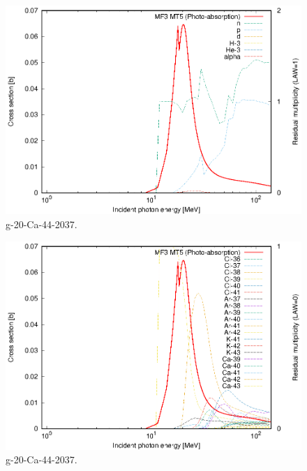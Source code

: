 \begin{figure}
 \includegraphics[width=\linewidth]{eps/g_20-Ca-44_2037.eps}
  \caption{g-20-Ca-44-2037.}
\end{figure}
\begin{figure}
 \includegraphics[width=\linewidth]{eps-law0/g_20-Ca-44_2037.eps}
 \caption{g-20-Ca-44-2037.}
\end{figure}
\newpage \clearpage

